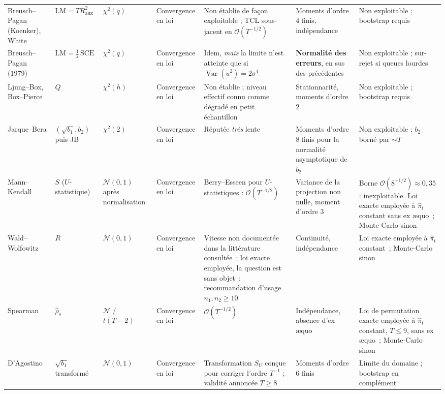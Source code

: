 \documentclass[a4paper,11pt]{article}
\begin{document}
\begin{landscape}
\begin{center}
\begin{longtable}{@{}p{2.7cm}p{3.4cm}p{2.6cm}p{2.5cm}p{3.5cm}p{3.0cm}p{3.6cm}@{}}
Breusch--Pagan (Koenker), White & $\mathrm{LM} = TR^2_{\text{aux}}$ & $\chi^2(q)$ &
Convergence en loi & Non établie de façon exploitable ; TCL sous-jacent en
$\mathcal{O}(T^{-1/2})$ & Moments d'ordre 4 finis, indépendance &
Non exploitable ; bootstrap requis \\

Breusch--Pagan (1979) & $\mathrm{LM} = \tfrac12\,\mathrm{SCE}$ & $\chi^2(q)$ &
Convergence en loi & Idem, \emph{mais} la limite n'est atteinte que si
$\operatorname{Var}(u^2)=2\sigma^4$ & \textbf{Normalité des erreurs}, en sus
des précédentes & Non exploitable ; sur-rejet si queues lourdes \\

Ljung--Box, Box--Pierce & $Q$ & $\chi^2(h)$ & Convergence en loi &
Non établie ; niveau effectif connu comme dégradé en petit échantillon &
Stationnarité, moments d'ordre 2 & Non exploitable ; bootstrap requis \\

Jarque--Bera & $(\sqrt{b_1}, b_2)$ puis JB & $\chi^2(2)$ &
Convergence en loi & Réputée \emph{très} lente & Moments d'ordre 8 finis
pour la normalité asymptotique de $b_2$ & Non exploitable ; $b_2$ borné
par $\sim T$ \\

Mann--Kendall & $S$ ($U$-statistique) & $\mathcal{N}(0,1)$ après
normalisation & Convergence en loi & Berry--Esseen pour $U$-statistiques :
$\mathcal{O}(T^{-1/2})$ & Variance de la projection non nulle, moment d'ordre 3 &
Borne $\mathcal{O}(8^{-1/2})\approx 0{,}35$ : inexploitable. Loi exacte employée à $\hat\pi_t$ constant sans ex \ae quo~; Monte-Carlo sinon \\

Wald--Wolfowitz & $R$ & $\mathcal{N}(0,1)$ & Convergence en loi &
Vitesse non documentée dans la littérature consultée~; loi exacte employée, la
question est sans objet~; recommandation d'usage $n_1,n_2\ge 10$ &
Continuité, indépendance & Loi exacte employée à $\hat\pi_t$ constant~; Monte-Carlo sinon \\

Spearman & $\hat\rho_s$ & $\mathcal{N}$ / $t(T-2)$ & Convergence en loi &
$\mathcal{O}(T^{-1/2})$ & Indépendance, absence d'ex \ae quo &
Loi de permutation exacte employée à $\hat\pi_t$ constant, $T \le 9$, sans ex \ae quo~; Monte-Carlo sinon \\

D'Agostino & $\sqrt{b_1}$ transformé & $\mathcal{N}(0,1)$ &
Convergence en loi & Transformation $S_U$ conçue pour corriger l'ordre
$T^{-1}$ ; validité annoncée $T\ge 8$ & Moments d'ordre 6 finis &
Limite du domaine ; bootstrap en complément \\


\end{longtable}
\end{center}
\end{landscape}
\end{document}
